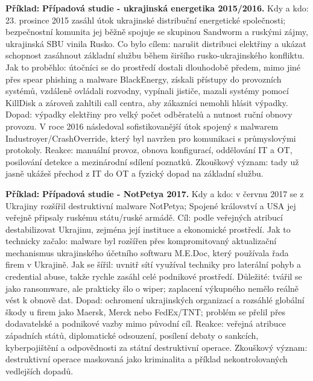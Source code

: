 \documentclass[11pt,a4paper]{article}
\newcommand{\priklad}[1]{\begin{tcolorbox}[breakable,enhanced,colback=green!7,colframe=green!30!black,boxrule=0pt,arc=1mm,left=5pt,right=5pt,top=5pt,bottom=5pt,before skip=6pt,after skip=6pt]\textbf{Příklad:} #1\end{tcolorbox}}
\begin{document}
\priklad{\textbf{Případová studie - ukrajinská energetika 2015/2016.} Kdy a kdo: 23. prosince 2015 zasáhl útok ukrajinské distribuční energetické společnosti; bezpečnostní komunita jej běžně spojuje se skupinou Sandworm a ruskými zájmy, ukrajinská SBU vinila Rusko. Co bylo cílem: narušit distribuci elektřiny a ukázat schopnost zasáhnout základní službu během širšího rusko-ukrajinského konfliktu. Jak to proběhlo: útočníci se do prostředí dostali dlouhodobě předem, mimo jiné přes spear phishing a malware BlackEnergy, získali přístupy do provozních systémů, vzdáleně ovládali rozvodny, vypínali jističe, mazali systémy pomocí KillDisk a zároveň zahltili call centra, aby zákazníci nemohli hlásit výpadky. Dopad: výpadky elektřiny pro velký počet odběratelů a nutnost ruční obnovy provozu. V roce 2016 následoval sofistikovanější útok spojený s malwarem Industroyer/CrashOverride, který byl navržen pro komunikaci s průmyslovými protokoly. Reakce: manuální provoz, obnova konfigurací, oddělování IT a OT, posilování detekce a mezinárodní sdílení poznatků. Zkouškový význam: tady už jasně ukážeš přechod z IT do OT a fyzický dopad na základní službu.}

\priklad{\textbf{Případová studie - NotPetya 2017.} Kdy a kdo: v červnu 2017 se z Ukrajiny rozšířil destruktivní malware NotPetya; Spojené království a USA jej veřejně připsaly ruskému státu/ruské armádě. Cíl: podle veřejných atribucí destabilizovat Ukrajinu, zejména její instituce a ekonomické prostředí. Jak to technicky začalo: malware byl rozšířen přes kompromitovaný aktualizační mechanismus ukrajinského účetního softwaru M.E.Doc, který používala řada firem v Ukrajině. Jak se šířil: uvnitř sítí využíval techniky pro laterální pohyb a credential abuse, takže rychle zasáhl celé podnikové prostředí. Důležité: tvářil se jako ransomware, ale prakticky šlo o wiper; zaplacení výkupného nemělo reálně vést k obnově dat. Dopad: ochromení ukrajinských organizací a rozsáhlé globální škody u firem jako Maersk, Merck nebo FedEx/TNT; problém se přelil přes dodavatelské a podnikové vazby mimo původní cíl. Reakce: veřejná atribuce západních států, diplomatické odsouzení, posílení debaty o sankcích, kyberpojištění a odpovědnosti za státní destruktivní operace. Zkouškový význam: destruktivní operace maskovaná jako kriminalita a příklad nekontrolovaných vedlejších dopadů.}
\end{document}
